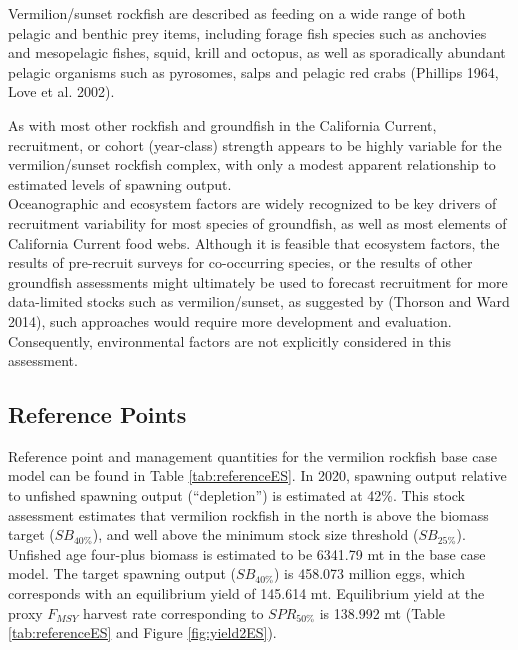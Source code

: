 \documentclass[11pt,
  english,
  a4paper,
]{article}
\begin{document}
Vermilion/sunset rockfish are described as feeding on a wide range of both pelagic and benthic prey items, including forage fish species such as anchovies and mesopelagic fishes, squid, krill and octopus, as well as sporadically abundant pelagic organisms such as pyrosomes, salps and pelagic red crabs {(Phillips 1964, Love et al. 2002)\leavevmode\tagmcend\tagstructend}.

As with most other rockfish and groundfish in the California Current, recruitment, or cohort (year-class) strength appears to be highly variable for the vermilion/sunset rockfish complex, with only a modest apparent relationship to estimated levels of spawning output.\\
Oceanographic and ecosystem factors are widely recognized to be key drivers of recruitment variability for most species of groundfish, as well as most elements of California Current food webs. Although it is feasible that ecosystem factors, the results of pre-recruit surveys for co-occurring species, or the results of other groundfish assessments might ultimately be used to forecast recruitment for more data-limited stocks such as vermilion/sunset, as suggested by {(Thorson and Ward 2014)\leavevmode\tagmcend\tagstructend}, such approaches would require more development and evaluation. Consequently, environmental factors are not explicitly considered in this assessment.

\FloatBarrier


\hypertarget{reference-points}{%
\subsection*{Reference Points}\label{reference-points}}

\leavevmode\tagmcend\tagstructend

Reference point and management quantities for the vermilion rockfish base case model can be found in Table \ref{tab:referenceES}. In 2020, spawning output relative to unfished spawning output (``depletion'') is estimated at 42\%. This stock assessment estimates that vermilion rockfish in the north is above the biomass target ({\(SB_{40\%}\)\leavevmode\tagmcend\tagstructend}), and well above the minimum stock size threshold ({\(SB_{25\%}\)\leavevmode\tagmcend\tagstructend}). Unfished age four-plus biomass is estimated to be 6341.79 mt in the base case model. The target spawning output ({\(SB_{40\%}\)\leavevmode\tagmcend\tagstructend}) is 458.073 million eggs, which corresponds with an equilibrium yield of 145.614 mt. Equilibrium yield at the proxy {\(F_{MSY}\)\leavevmode\tagmcend\tagstructend} harvest rate corresponding to {\(SPR_{50\%}\)\leavevmode\tagmcend\tagstructend} is 138.992 mt (Table \ref{tab:referenceES} and Figure \ref{fig:yield2ES}).
\end{document}
